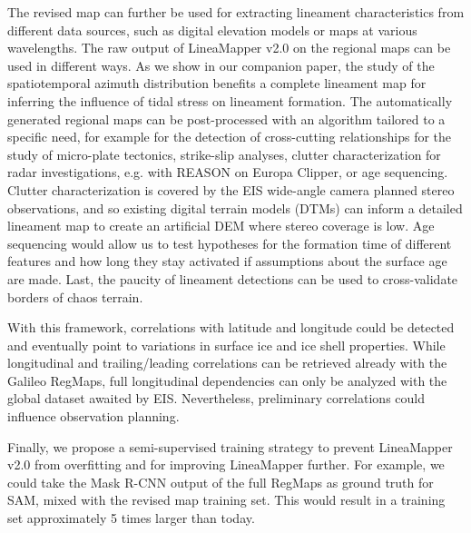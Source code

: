 The revised map can further be used for extracting lineament characteristics from different data sources, such as digital elevation models or maps at various wavelengths. 
The raw output of LineaMapper v2.0 on the regional maps can be used in different ways. As we show in our companion paper, the study of the spatiotemporal azimuth distribution benefits a complete lineament map for inferring the influence of tidal stress on lineament formation. 
The automatically generated regional maps can be post-processed with an algorithm tailored to a specific need, for example for the detection of cross-cutting relationships for the study of micro-plate tectonics, strike-slip analyses, clutter characterization for radar investigations, e.g. with REASON on Europa Clipper, or age sequencing. Clutter characterization is covered by the EIS wide-angle camera planned stereo observations, and so existing digital terrain models (DTMs) can inform a detailed lineament map to create an artificial DEM where stereo coverage is low. Age sequencing would allow us to test hypotheses for the formation time of different features and how long they stay activated if assumptions about the surface age are made. %
Last, the paucity of lineament detections can be used to cross-validate borders of chaos terrain.

With this framework, correlations with latitude and longitude could be detected and eventually point to variations in surface ice and ice shell properties. While longitudinal and trailing/leading correlations can be retrieved already with the Galileo RegMaps, full longitudinal dependencies can only be analyzed with the global dataset awaited by EIS. Nevertheless, preliminary correlations could influence observation planning.

Finally, we propose a semi-supervised training strategy to prevent LineaMapper v2.0 from overfitting and for improving LineaMapper further. For example, we could take the Mask R-CNN output of the full RegMaps as ground truth for SAM, mixed with the revised map training set. This would result in a training set approximately 5 times larger than today.


